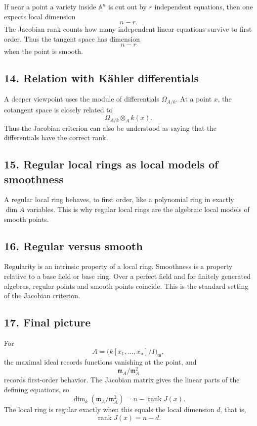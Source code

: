 \documentclass[12pt,a4paper]{article}
\theoremstyle{plain}
\theoremstyle{definition}      %
\begin{document}
	If near a point a variety inside \(\mathbb A^n\) is cut out by \(r\) independent equations, then one expects local dimension
	\[
	n-r.
	\]
	The Jacobian rank counts how many independent linear equations survive to first order. Thus the tangent space has dimension
	\[
	n-r
	\]
	when the point is smooth.
	
	\subsection*{14. Relation with K\"ahler differentials}
	
	A deeper viewpoint uses the module of differentials \(\Omega_{A/k}\). At a point \(x\), the cotangent space is closely related to
	\[
	\Omega_{A/k}\otimes_A k(x).
	\]
	Thus the Jacobian criterion can also be understood as saying that the differentials have the correct rank.
	
	\subsection*{15. Regular local rings as local models of smoothness}
	
	A regular local ring behaves, to first order, like a polynomial ring in exactly \(\dim A\) variables. This is why regular local rings are the algebraic local models of smooth points.
	
	\subsection*{16. Regular versus smooth}
	
	Regularity is an intrinsic property of a local ring. Smoothness is a property relative to a base field or base ring. Over a perfect field and for finitely generated algebras, regular points and smooth points coincide. This is the standard setting of the Jacobian criterion.
	
	\subsection*{17. Final picture}
	
	For
	\[
	A=\bigl(k[x_1,\dots,x_n]/I\bigr)_{\bar{\mathfrak m}},
	\]
	the maximal ideal records functions vanishing at the point, and
	\[
	\mathfrak m_A/\mathfrak m_A^2
	\]
	records first-order behavior. The Jacobian matrix gives the linear parts of the defining equations, so
	\[
	\dim_k(\mathfrak m_A/\mathfrak m_A^2)=n-\operatorname{rank}J(x).
	\]
	The local ring is regular exactly when this equals the local dimension \(d\), that is,
	\[
	\operatorname{rank}J(x)=n-d.
	\]
	
\end{document}
